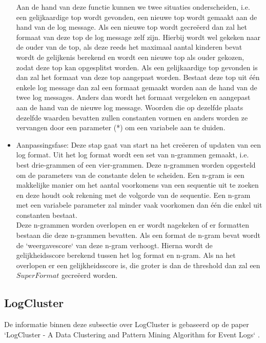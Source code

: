 \begin{itemize}
    Aan de hand van deze functie kunnen we twee situaties onderscheiden, i.e. een gelijkaardige top wordt gevonden, een nieuwe top wordt gemaakt aan de hand van de log message. Als een nieuwe top wordt gecreëerd dan zal het formaat van deze top de log message zelf zijn. Hierbij wordt wel gekeken naar de ouder van de top, als deze reeds het maximaal aantal kinderen bevat wordt de gelijkenis berekend en wordt een nieuwe top als ouder gekozen, zodat deze top kan opgesplitst worden. Als een gelijkaardige top gevonden is dan zal het formaat van deze top aangepast worden. Bestaat deze top uit één enkele log message dan zal een formaat gemaakt worden aan de hand van de twee log messages. Anders dan wordt het formaat vergeleken en aangepast aan de hand van de nieuwe log message. Woorden die op dezelfde plaats dezelfde waarden bevatten zullen constanten vormen en anders worden ze vervangen door een parameter (*) om een variabele aan te duiden.\\
    
    \item Aanpassingsfase: Deze stap gaat van start na het creëeren of updaten van een log format. Uit het log format wordt een set van n-grammen gemaakt, i.e. best drie-grammen of een vier-grammen. Deze n-grammen worden opgesteld om de parameters van de constante delen te scheiden. Een n-gram is een makkelijke manier om het aantal voorkomens van een sequentie uit te zoeken en deze houdt ook rekening met de volgorde van de sequentie. Een n-gram met een variabele parameter zal minder vaak voorkomen dan één die enkel uit constanten bestaat.\\
    
    Deze n-grammen worden overlopen en er wordt nagekeken of er formatten bestaan die deze n-grammen bevatten. Als een format de n-gram bevat wordt de `weergavescore` van deze n-gram verhoogt. Hierna wordt de gelijkheidsscore berekend tussen het log format en n-gram. Als na het overlopen er een gelijkheidsscore is, die groter is dan de threshold dan zal een $SuperFormat$ gecreëerd worden. 
\end{itemize}

\subsection{LogCluster}
De informatie binnen deze subsectie over LogCluster is gebaseerd op de paper `LogCluster - A Data Clustering and Pattern Mining Algorithm for Event Logs` \autocite{vaarandi2015logcluster}.

